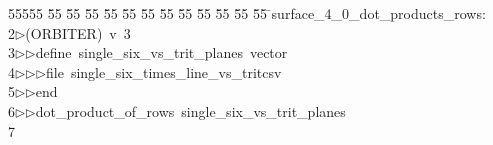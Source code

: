 %
%
\begin{tabbing}
55555 \= 55 \= 55 \= 55 \= 55 \= 55 \= 55 \= 55 \= 55 \= 55 \= 55 \= 55 \= 55 \= \>surface\_4\_0\_dot\_products\_rows:\\[0pt]
2\>$\triangleright$\>(ORBITER)\ v\ 3\ \\[0pt]
3\>$\triangleright$\>$\triangleright$\>define\ single\_six\_vs\_trit\_planes\ vector\ \\[0pt]
4\>$\triangleright$\>$\triangleright$\>$\triangleright$\>file\ single\_six\_times\_line\_vs\_tritcsv\ \\[0pt]
5\>$\triangleright$\>$\triangleright$\>end\ \\[0pt]
6\>$\triangleright$\>$\triangleright$\>dot\_product\_of\_rows\ single\_six\_vs\_trit\_planes\\[0pt]
7\>\end{tabbing}
